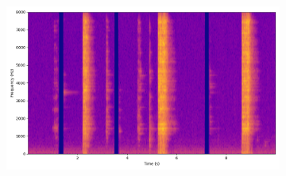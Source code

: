 \begin{figure}[htbp]
\begin{subfigure}[b]{0.185\textwidth}
    \end{subfigure}
    \begin{subfigure}[b]{0.185\textwidth}
        \centering
        \includegraphics[width=\textwidth]{plots/onepeace_best_sdri/onepeace target_spectrogram.png}
    \end{subfigure}


\end{figure}
